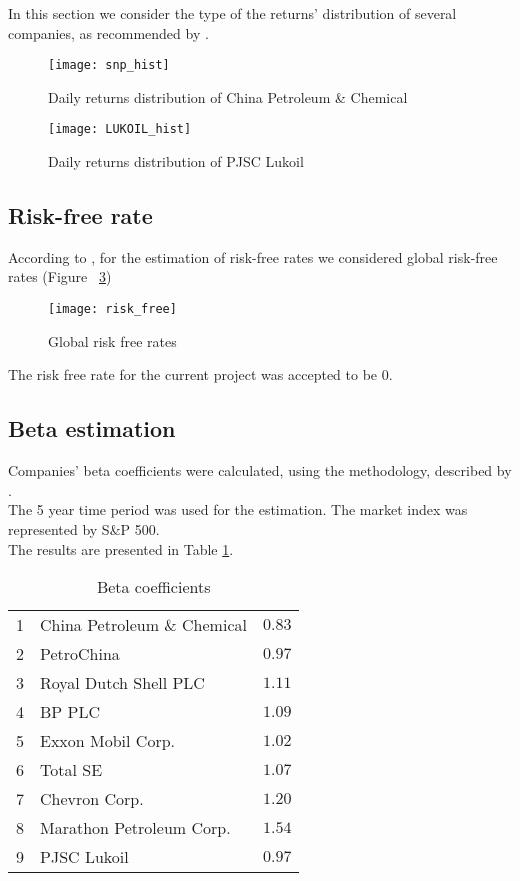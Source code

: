 \documentclass [a4paper, 11pt] {article}
\begin{document}
In this section we consider the type of the returns' distribution of several companies, as recommended by \cite{Fishman}.

\begin{figure}[h]
\caption{Daily returns distribution of China Petroleum \& Chemical}
\texttt{[image: snp\_hist]}
\label{fig:hist1}
\end{figure}

\begin{figure}[h]
\caption{Daily returns distribution of PJSC Lukoil}
\texttt{[image: LUKOIL\_hist]}
\label{fig:hist1}
\end{figure}


\clearpage
\subsection {Risk-free rate}

According to \cite{Anderson}, for the estimation of risk-free rates we considered global risk-free rates (Figure ~\ref{fig:rf})

\begin{figure}[!tbp]
\caption{Global risk free rates}
\texttt{[image: risk\_free]}
\label{fig:rf}
\end{figure}

The risk free rate for the current project was accepted to be 0.

\clearpage
\subsection {Beta estimation}

Companies' beta coefficients were calculated, using the methodology, described by \cite{Casey}.\\
The 5 year time period was used for the estimation. The market index was represented by S\&P 500.\\
The results are presented in Table \ref{tab:beta}.\\

\begin{table}[!h]
\caption{Beta coefficients\label{beta}} 
\begin{center}
\begin{tabular}{llr}
\hline\hline
1&China Petroleum \& Chemical&$0.83$\tabularnewline
2&PetroChina&$0.97$\tabularnewline
3&Royal Dutch Shell PLC&$1.11$\tabularnewline
4&BP PLC&$1.09$\tabularnewline
5&Exxon Mobil Corp.&$1.02$\tabularnewline
6&Total SE&$1.07$\tabularnewline
7&Chevron Corp.&$1.20$\tabularnewline
8&Marathon Petroleum Corp.&$1.54$\tabularnewline
9&PJSC Lukoil&$0.97$\tabularnewline
\hline
\end{tabular}\end{center}
\label{tab:beta}
\end{table}
\end{document}

